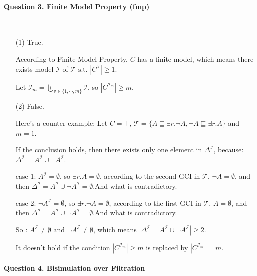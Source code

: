 \documentclass[12pt]{article}
\begin{document}
    \paragraph{Question 3. Finite Model Property (fmp)}~{}
    \\
    \begin{enumerate}
    \item[(1)] True.\par
    According to Finite Model Property, $C$ has a finite model, which means there exists model $\mathcal{I}$ of $\mathcal{T} \text{ s.t. } |C^{\mathcal{I}}| \geq 1$. \par
    Let $\mathcal{I}_m = \biguplus_{v \in \{ 1, \cdots, m \}}\mathcal{I}$, so $|C^{\mathcal{I}_m}| \geq m$.
    \item[(2)]  False.\par
    Here's a counter-example: Let $C = \top$, $\mathcal{T} = \{ A \sqsubseteq \exists r.\lnot A, \lnot A  \sqsubseteq \exists r.A \}$ and $m = 1$. \par
    If the conclusion holds, then there exists only one element in $\Delta^{\mathcal{I}}$, because: $\Delta^{\mathcal{I}} = A^{\mathcal{I}} \cup \lnot A^{\mathcal{I}}$. \par
    case 1: $A^{\mathcal{I}} = \emptyset$, so $\exists r. A = \emptyset$, according to the second GCI in $\mathcal{T}$, $\lnot A = \emptyset$, and then $\Delta^{\mathcal{I}} = A^{\mathcal{I}} \cup \lnot A^{\mathcal{I}} = \emptyset$.And what is contradictory. \par
    case 2: $\lnot A^{\mathcal{I}} = \emptyset$, so $\exists r. \lnot A = \emptyset$, according to the first GCI in $\mathcal{T}$, $ A = \emptyset$, and then $\Delta^{\mathcal{I}} = A^{\mathcal{I}} \cup \lnot A^{\mathcal{I}} = \emptyset$.And what is contradictory. \par 
    So : $A^{\mathcal{I}} \neq \emptyset \text{ and } \lnot A^{\mathcal{I}} \neq \emptyset$, which means $|\Delta^{\mathcal{I}} = A^{\mathcal{I}} \cup \lnot A^{\mathcal{I}}| \geq 2$.\par
    It doesn't hold if the condition $|C^{\mathcal{I}_m}| \ge m$ is replaced by $|C^{\mathcal{I}_m}| = m$.
\end{enumerate}
    \paragraph{Question 4. Bisimulation over Filtration}~{}
    \\
\end{document}
